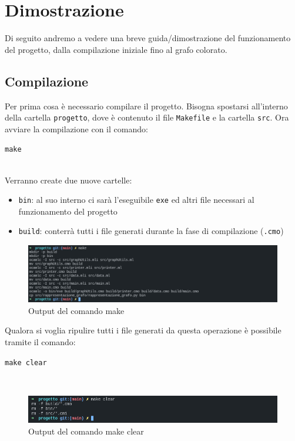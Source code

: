 
\section{Dimostrazione}
Di seguito andremo a vedere una breve guida/dimostrazione del funzionamento del progetto, dalla compilazione iniziale fino al grafo colorato.

\subsection{Compilazione}
Per prima cosa è necessario compilare il progetto. Bisogna spostarsi all'interno della cartella \lstinline[style=cmd]|progetto|, dove è contenuto il file \lstinline[style=cmd]|Makefile| e la cartella \lstinline[style=cmd]|src|. Ora avviare la compilazione con il comando:

\begin{center}
	\lstinline[style=cmd]|make|
\end{center}
\ \\
Verranno create due nuove cartelle: 

\begin{itemize}
	\item \lstinline[style=cmd]|bin|: al suo interno ci sarà l'eseguibile \lstinline[style=cmd]|exe| ed altri file necessari al funzionamento del progetto
	\item \lstinline[style=cmd]|build|: conterrà tutti i file generati durante la fase di compilazione (\lstinline[style=cmd]|.cmo|)
\end{itemize}

\begin{figure}[H]
	\centering
	\includegraphics[width=\textwidth]{img/make.png}
	\caption{Output del comando make}
\end{figure}

Qualora si voglia ripulire tutti i file generati da questa operazione è possibile tramite il comando:

\begin{center}
	\lstinline[style=cmd]|make clear|
\end{center}
\ \\
\begin{figure}[H]
	\centering
	\includegraphics[width=.8\textwidth]{img/makeclear.png}
	\caption{Output del comando make clear}
\end{figure}

